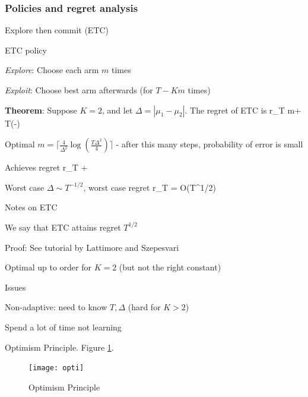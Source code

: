 \documentclass[english]{article}
\begin{document}
\eenum

\subsubsection{Policies and regret analysis}

\benum

\item {Explore then commit (ETC)}
\bitem 
\item ETC policy
\benum
\item {\it Explore}: Choose each arm $m$ times
\item {\it Exploit}: Choose best arm afterwards (for $T-Km$ times)
\eenum
\item {\bf Theorem}: Suppose $K=2$, and let $\Delta = |\mu_1-\mu_2|$. The regret of ETC is 
\beqs
r_T \le m\Delta + T\Delta \exp\left(-\right)
\eeqs
\item Optimal $m = \lceil\frac{4}{\Delta^2}\log(\frac{T\Delta^2}{4})\rceil$ - after this many steps, probability of error is small
\item Achieves regret
\beqs
r_T \le {} + \Delta 
\eeqs
\item Worst case $\Delta \sim T^{-1/2}$, worst case regret
\beqs
r_T  = O(T^{1/2}) 
\eeqs
\eitem



\item {Notes on ETC}
\bitem 
\item We say that ETC attains regret $T^{1/2}$
\item Proof: See tutorial by Lattimore and Szepesvari
\item Optimal up to order for $K=2$ (but not the right constant)
\item Issues
\bitem 
\item Non-adaptive: need to know $T,\Delta$ (hard for $K>2$)
\item Spend a lot of time not learning
\eitem

\eitem




\item {Optimism Principle}. Figure \ref{opti}.
\begin{figure}[h!]
\begin{center}
\texttt{[image: opti]}
    \caption{Optimism Principle}
    \label{opti}
\end{center}
\end{figure}
\end{document}
